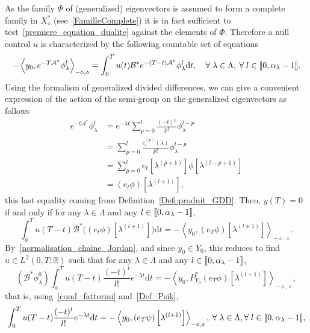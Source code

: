 \documentclass[11pt]{article}
\theoremstyle{definition}
\numberwithin{equation}{section}
\numberwithin{figure}{section}
\numberwithin{table}{section}
\newcommand{\llbracket}{\mathopen{[\mkern -2.7mu[}}
\newcommand{\rrbracket}{\mathclose{]\mkern -2.7mu]}}
\newcommand{\inter}[2]{\llbracket #1,#2 \rrbracket}
\newcommand\As{\mathcal{A}^*}
\newcommand\Bs{\mathcal{B}^*}
\newcommand{\Xalphas}{X_\diamond^*}
\newcommand{\Fzp}{Y_0}
\newcommand{\dual}[2]{\left\langle #1, #2 \right\rangle_{-\diamond,\diamond}}
\newcommand{\PFa}{P_{\Fzp}^*}
\newcommand{\R}{\mathbb{R}}
\newcommand{\md}{\mathrm{d}}
\let\oldforall\forall
\renewcommand*{\forall}{\mathrel{\oldforall}}
\begin{document}
As the family $\Phi$ of (generalized) eigenvectors is assumed to form a complete family in $\Xalphas$ (see~\eqref{FamilleComplete}) it is in fact sufficient to test~\eqref{premiere_equation_dualite} against the elements of $\Phi$. Therefore a null control $u$ is characterized by the following countable set of equations
\begin{equation}\label{pb_moment_v1}
-\dual{y_0}{e^{-T \As} \phi_\lambda^l} = \int_0^T u(t) \Bs e^{-(T-t) \As} \phi_\lambda^l \md t, \quad \forall \lambda \in \Lambda, \: \forall l \in \inter{0}{\alpha_\lambda-1}.
\end{equation}
Using the formalism of generalized divided differences, we can give a convenient expression of the action of the semi-group on the generalized eigenvectors as follows
\begin{equation}\label{Action_SemiGroupe_DDgeneralisees}
\begin{aligned}
e^{-t\As} \phi_\lambda^l & = e^{-\lambda t} \sum_{p=0}^l \frac{(-t)^p}{p!} \phi_\lambda^{l-p} \\
& = \sum_{p=0}^l \frac{e_t^{(p)}(\lambda)}{p!} \phi_\lambda^{l-p} \\
& = \sum_{p=0}^l e_t\left[\lambda^{(p+1)}\right] \phi\left[\lambda^{(l-p+1)}\right] \\
& = (e_t \phi) \left[\lambda^{(l+1)}\right],
\end{aligned}
\end{equation}
this last equality coming from Definition~\ref{Defi:produit_GDD}. Then, $y(T)=0$ if and only if for any $\lambda\in \Lambda$ and any $l\in \inter{0}{\alpha_{\lambda}-1}$,
\[
\int_0^T u(T-t) \Bs \big((e_t \phi) \left[\lambda^{(l+1)}\right] \big) \md t = -\dual{y_0}{(e_T \phi) \left[\lambda^{(l+1)}\right] }.
\]
By~\eqref{normalisation_chaine_Jordan}, and since $y_0\in \Fzp$, this reduces to find $u \in L^2(0,T;\R)$ such that for any $\lambda\in \Lambda$ and any $l\in \inter{0}{\alpha_{\lambda}-1}$,
\[
\left(\Bs \phi_{\lambda}^0\right) \int_0^T u(T-t) \frac{(-t)^l}{l!} e^{-\lambda t} \md t = -\dual{y_0}{\PFa (e_T \phi) \left[\lambda^{(l+1)}\right] },
\]
that is, using~\eqref{cond_fattorini} and~\eqref{Def_Psik},
\begin{equation}\label{Pbmoment_DDgeneralisees}
\int_0^T u(T-t) \frac{(-t)^l}{l!} e^{-\lambda t} \md t = -\dual{y_0}{(e_T \psi) \left[\lambda^{(l+1)}\right] }, \: \forall \lambda\in \Lambda,\forall l\in \inter{0}{\alpha_{\lambda}-1},
\end{equation}
\end{document}
